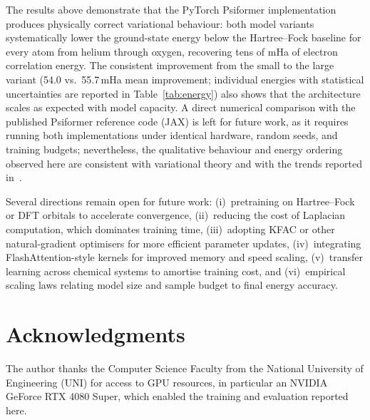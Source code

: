 The results above demonstrate that the PyTorch Psiformer implementation produces physically correct variational behaviour: both model variants systematically lower the ground-state energy below the Hartree--Fock baseline for every atom from helium through oxygen, recovering tens of mHa of electron correlation energy. The consistent improvement from the small to the large variant (54.0 vs.\ 55.7\,mHa mean improvement; individual energies with statistical uncertainties are reported in Table~\ref{tab:energy}) also shows that the architecture scales as expected with model capacity. A direct numerical comparison with the published Psiformer reference code (JAX) is left for future work, as it requires running both implementations under identical hardware, random seeds, and training budgets; nevertheless, the qualitative behaviour and energy ordering observed here are consistent with variational theory and with the trends reported in~\cite{psiformer}.

Several directions remain open for future work: (i)~pretraining on Hartree--Fock or DFT orbitals to accelerate convergence, (ii)~reducing the cost of Laplacian computation, which dominates training time, (iii)~adopting KFAC or other natural-gradient optimisers for more efficient parameter updates, (iv)~integrating FlashAttention-style kernels for improved memory and speed scaling, (v)~transfer learning across chemical systems to amortise training cost, and (vi)~empirical scaling laws relating model size and sample budget to final energy accuracy.

\section*{Acknowledgments}
The author thanks the Computer Science Faculty from the National University of Engineering (UNI) for access to GPU resources, in particular an NVIDIA GeForce RTX 4080 Super, which enabled the training and evaluation reported here.

